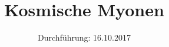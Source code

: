 

\subject{Versuchsprotokoll zum Versuch Nr. 01}
\title{Kosmische Myonen}
\date{
  Durchführung: 16.10.2017
}



\maketitle
\thispagestyle{empty}
\tableofcontents
\newpage


\clearpage
\newpage
%

\clearpage
\newpage

\clearpage
\newpage

\clearpage
\newpage

\clearpage
\newpage

\printbibliography

\clearpage
\newpage





%
%
%     
%
